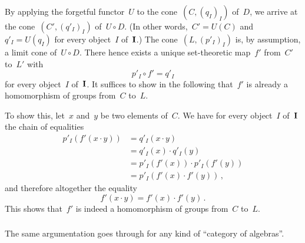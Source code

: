By applying the forgetful functor~$U$ to the cone~$(C, (q_I)_I)$ of~$D$, we arrive at the cone~$(C', (q'_I)_I)$ of~$U ∘ D$.
(In other words,~$C' = U(C)$ and~$q'_I = U(q_I)$ for every object~$I$ of~$\mathbf{I}$.)
The cone~$(L, (p'_I)_I)$ is, by assumption, a limit cone of~$U ∘ D$.
There hence exists a unique set-theoretic map~$f'$ from~$C'$ to~$L'$ with
\[
	p'_I ∘ f' = q'_I
\]
for every object~$I$ of~$\mathbf{I}$.
It suffices to show in the following that~$f'$ is already a homomorphism of groups from~$C$ to~$L$.

To show this, let~$x$ and~$y$ be two elements of~$C$.
We have for every object~$I$ of~$\mathbf{I}$ the chain of equalities
\begin{align*}
	p'_I( f'(x ⋅ y) )
	&=
	q'_I( x ⋅ y )
	\\
	&=
	q'_I(x) ⋅ q'_I(y)
	\\
	&=
	p'_I( f'(x) ) ⋅ p'_I( f'(y) )
	\\
	&=
	p'_I( f'(x) ⋅ f'(y) ) \,,
\end{align*}
and therefore altogether the equality
\[
	f'(x ⋅ y) = f'(x) ⋅ f'(y) \,.
\]
This shows that~$f'$ is indeed a homomorphism of groups from~$C$ to~$L$.



\subsubsection{}

The same argumentation goes through for any kind of \enquote{category of algebras}.
